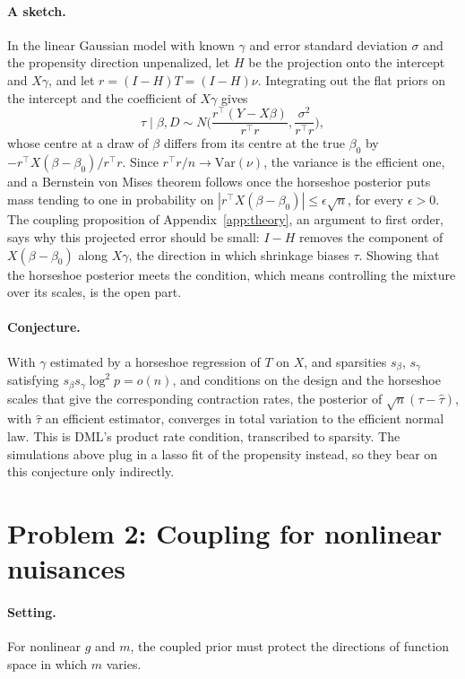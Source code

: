 \paragraph{A sketch.} In the linear Gaussian model with known $\gamma$ and error standard deviation $\sigma$ and the propensity direction unpenalized, let $H$ be the projection onto the intercept and $X\gamma$, and let $r = (I - H)T = (I - H)\nu$. Integrating out the flat priors on the intercept and the coefficient of $X\gamma$ gives
\[
\tau \mid \beta, D \sim N\Big(\frac{r^\top(Y - X\beta)}{r^\top r}, \frac{\sigma^2}{r^\top r}\Big),
\]
whose centre at a draw of $\beta$ differs from its centre at the true $\beta_0$ by $-r^\top X(\beta - \beta_0)/r^\top r$. Since $r^\top r/n \to \mathrm{Var}(\nu)$, the variance is the efficient one, and a Bernstein von Mises theorem follows once the horseshoe posterior puts mass tending to one in probability on $|r^\top X(\beta - \beta_0)| \le \epsilon\sqrt{n}$, for every $\epsilon > 0$. The coupling proposition of Appendix~\ref{app:theory}, an argument to first order, says why this projected error should be small: $I - H$ removes the component of $X(\beta - \beta_0)$ along $X\gamma$, the direction in which shrinkage biases $\tau$. Showing that the horseshoe posterior meets the condition, which means controlling the mixture over its scales, is the open part.

\paragraph{Conjecture.} With $\gamma$ estimated by a horseshoe regression of $T$ on $X$, and sparsities $s_\beta$, $s_\gamma$ satisfying $s_\beta s_\gamma\log^2 p = o(n)$, and conditions on the design and the horseshoe scales that give the corresponding contraction rates, the posterior of $\sqrt{n}(\tau - \hat\tau)$, with $\hat\tau$ an efficient estimator, converges in total variation to the efficient normal law. This is DML's product rate condition, transcribed to sparsity. The simulations above plug in a lasso fit of the propensity instead, so they bear on this conjecture only indirectly.

\section{Problem 2: Coupling for nonlinear nuisances}

\paragraph{Setting.} For nonlinear $g$ and $m$, the coupled prior must protect the directions of function space in which $m$ varies.

